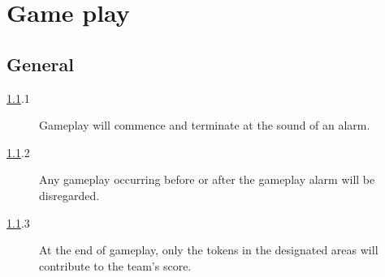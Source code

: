\section {Game play}

\subsection {General}
\label {genplay}

\begin {description}
\item [\ref{genplay}.1] Gameplay will commence and terminate at the sound of an alarm.
\item [\ref{genplay}.2] Any gameplay occurring before or after the gameplay alarm will be disregarded.
\item [\ref{genplay}.3] At the end of gameplay, only the tokens in the designated areas will contribute to the team's score.
\end {description}
